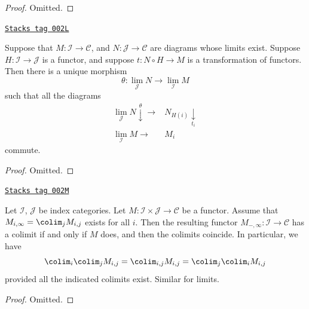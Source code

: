 \begin{proof}
Omitted.
\end{proof}

\begin{lemma}
\label{categories-lemma-functorial-limit}
\href{https://stacks.math.columbia.edu/tag/002L}{\texttt{Stacks tag 002L}}

Suppose that $M : \mathcal{I} \to \mathcal{C}$,
and $N : \mathcal{J} \to \mathcal{C}$ are diagrams
whose limits exist. Suppose $H : \mathcal{I} \to \mathcal{J}$ is
a functor, and suppose $t : N \circ H \to M$
is a transformation of functors.
Then there is a unique morphism
$$
\theta :
\lim_\mathcal{J} N
\longrightarrow
\lim_\mathcal{I} M
$$
such that all the diagrams
$$
\begin{array}{cc}\lim_\mathcal{J} N \overset{\theta}{\downarrow}\longrightarrow & N_{H(i)} \underset{t_i}{\downarrow} \\ \lim_\mathcal{I} M \longrightarrow & M_i\end{array}
$$
commute.
\end{lemma}

\begin{proof}
Omitted.
\end{proof}


\begin{lemma}
\label{categories-lemma-colimits-commute}
\href{https://stacks.math.columbia.edu/tag/002M}{\texttt{Stacks tag 002M}}

Let $\mathcal{I}$, $\mathcal{J}$ be index categories. Let
$M : \mathcal{I} \times \mathcal{J} \to \mathcal{C}$ be a functor.
Assume that $M_{i, \infty} = \colim_j M_{i,j}$
exists for all $i$. Then the resulting functor
$M_{-, \infty} : \mathcal{I} \to \mathcal{C}$
has a colimit if and only if $M$ does, and then the colimits coincide.
In particular, we have
$$
\colim_i \colim_j M_{i, j}
=
\colim_{i, j} M_{i, j}
=
\colim_j \colim_i M_{i, j}
$$
provided all the indicated colimits exist. Similar for limits.
\end{lemma}

\begin{proof}
Omitted.
\end{proof}

